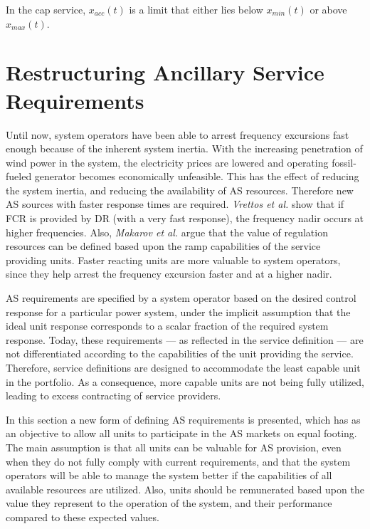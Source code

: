 In the cap service, $x_{acc}(t)$ is a limit that either lies below $x_{min}(t)$ or above $x_{max}(t)$.



%
\section{Restructuring Ancillary Service Requirements} %
\label{sec:RedefiningAncillaryServiceRequirements}
Until now, system operators have been able to arrest frequency excursions fast enough because of the inherent system inertia. With the increasing penetration of wind power in the system, the electricity prices are lowered and operating fossil-fueled generator becomes economically unfeasible. This has the effect of reducing the system inertia, and reducing the availability of AS resources. Therefore new AS sources with faster response times are required. \emph{Vrettos et al.}\cite{vrettos2015integrating} show that if FCR is provided by DR (with a very fast response), the frequency nadir occurs at higher frequencies.
Also, \emph{Makarov et al.}\cite{makarov2008assessing} argue that the value of regulation resources can be defined based upon the ramp capabilities of the service providing units. Faster reacting units are more valuable to system operators, since they help arrest the frequency excursion faster and at a higher nadir.%

AS requirements are specified by a system operator based on the desired control response for a particular power system, under the implicit assumption that the ideal unit response corresponds to a scalar fraction of the required system response. Today, these requirements --- as reflected in the service definition --- are not differentiated according to the capabilities of the unit providing the service. Therefore, service definitions are designed to accommodate the least capable unit in the portfolio. As a consequence, more capable units are not being fully utilized, leading to excess contracting of service providers.

 In this section a new form of defining AS requirements is presented, which has as an objective to allow all units to participate in the AS markets on equal footing. The main assumption is that all units can be valuable for AS provision, even when they do not fully comply with current requirements, and that the system operators will be able to manage the system better if the capabilities of all available resources are utilized. Also, units should be remunerated based upon the value they represent to the operation of the system, and their performance compared to these expected values.

